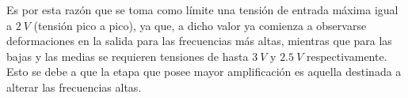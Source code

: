Es por esta razón que se toma como límite una tensión de entrada máxima igual a $2 \ V$ (tensión pico a pico), ya que, a dicho valor ya comienza a observarse deformaciones en la salida para las frecuencias más altas, mientras que para las bajas y las medias se requieren tensiones de hasta $3 \ V$ y $2.5 \ V$ respectivamente. Esto se debe a que la etapa que posee mayor amplificación es aquella destinada a alterar las frecuencias altas.


